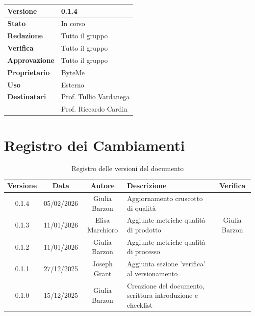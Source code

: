 \documentclass[11pt,a4paper]{article}
\begin{document}
\begin{titlepage}
    \begin{table}[H]
        \centering
        \begin{tabular}{|l|p{5cm}|}
            \hline
            \textbf{Versione} & 0.1.4 \\
            \hline
            \textbf{Stato} & In corso \\
            \hline
            \textbf{Redazione} & Tutto il gruppo \\
            \hline
            \textbf{Verifica} & Tutto il gruppo \\
            \hline
            \textbf{Approvazione} & Tutto il gruppo \\
            \hline
            \textbf{Proprietario} & ByteMe \\
            \hline
            \textbf{Uso} & Esterno \\
            \hline
            \textbf{Destinatari} & Prof. Tullio Vardanega \\ & Prof. Riccardo Cardin \\
            \hline
        \end{tabular}
    \end{table}
    
    \vfill
\end{titlepage}

\thispagestyle{empty}
\section*{Registro dei Cambiamenti}

\begin{table}[H]
    \centering
    \begin{tabular}{|c|c|c|>{\raggedright\arraybackslash}p{}|c|}
        \hline
        \textbf{Versione} & \textbf{Data} & \textbf{Autore} & \textbf{Descrizione} & \textbf{Verifica} \\
        \hline
        0.1.4 & 05/02/2026 & Giulia Barzon & Aggiornamento cruscotto di qualità &  \\
        \hline
        0.1.3 & 11/01/2026 & Elisa Marchioro & Aggiunte metriche qualità di prodotto & Giulia Barzon \\
        \hline
        0.1.2 & 11/01/2026 & Giulia Barzon & Aggiunte metriche qualità di processo & \\
        \hline
        0.1.1 & 27/12/2025 & Joseph Grant & Aggiunta sezione 'verifica' al versionamento & \\
        \hline
        0.1.0 & 15/12/2025 & Giulia Barzon & Creazione del documento, scrittura introduzione e checklist & \\
        \hline
    \end{tabular}
    \caption{Registro delle versioni del documento}
    \label{tab:versionamento}
\end{table}
\end{document}
